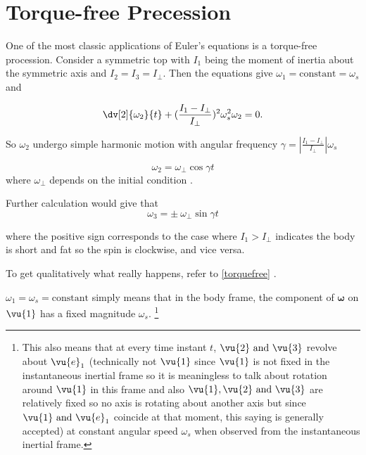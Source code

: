 \documentclass[a4paper,12pt]{report}
\begin{document}
\section{Torque-free Precession}

One of the most classic applications of Euler's equations is a torque-free procession. Consider a symmetric top with \(I_1\) being the moment of inertia about the symmetric axis and \(I_2 = I_3 = I_{\perp } \). Then the equations give \(\omega _{1} = \text{constant} = \omega _{s}  \) and 

\begin{equation}
	\dv[2]{\omega _{2} }{t} + (\frac{I_1-I_{\perp } }{I_{\perp } } )^2 \omega _{s} ^2 \omega _{2} = 0 .
\end{equation}

So \(\omega _{2} \) undergo simple harmonic motion with angular frequency \(\gamma = \left| \frac{I_1-I_{\perp } }{I_{\perp } }  \right| \omega _{s}  \) 

\begin{equation}
	\omega _{2} = \omega _{\perp } \cos \gamma t
\end{equation}
where \(\omega _{\perp }  \) depends on the initial condition .

Further calculation would give that 
\begin{equation}
	\omega _{3} = \pm ~ \omega _{\perp } \sin \gamma t
\end{equation}

where the positive sign corresponds to the case where \(I_1 > I_{\perp } \) indicates the body is short and fat so the spin is clockwise, and vice versa.

To get qualitatively what really happens, refer to \cref{torquefree} . 

\(\omega _{1} = \omega _{s} = \text{constant}  \) simply means that in the body frame, the component of  \(\boldsymbol{\omega } \) on \(\vu{1} \) has a fixed magnitude \(\omega _{s} \). \footnote{This also means that at every time instant \(t\), \(\vu{2} \text{ and } \vu{3} \) revolve about \(\vu{e} _{1}  \) (technically not \(\vu{1} \) since \(\vu{1} \) is not fixed in the instantaneous inertial frame so it is meaningless to talk about rotation around \(\vu{1} \) in this frame and also \(\vu{1}, \vu{2} \text{ and } \vu{3} \) are relatively fixed so no axis is rotating about another axis but since \(\vu{1} \text{ and } \vu{e} _{1} \) coincide at that moment, this saying is generally accepted) at constant angular speed \(\omega _{s} \) when observed from the instantaneous inertial frame.}    
\end{document}
